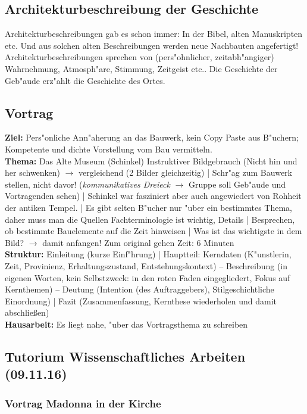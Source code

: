 \documentclass[emulatestandardclasses]{scrartcl}
\begin{document}
\subsection{Architekturbeschreibung der Geschichte}

Architekturbeschreibungen gab es schon immer: In der Bibel, alten Manuskripten etc. Und aus solchen alten Beschreibungen werden neue Nachbauten angefertigt!
Architekturbeschreibungen sprechen von (pers"ohnlicher, zeitabh"angiger) Wahrnehmung, Atmosph"are, Stimmung, Zeitgeist etc.. Die Geschichte der Geb"aude erz"ahlt die Geschichte des Ortes.


\subsection{Vortrag}

\textbf{Ziel:} Pers"onliche Ann"aherung an das Bauwerk, kein Copy Paste aus B"uchern; 
Kompetente und dichte Vorstellung vom Bau vermitteln. \\
\textbf{Thema:} Das Alte Museum (Schinkel)
Instruktiver Bildgebrauch (Nicht hin und her schwenken) $\rightarrow$ vergleichend (2 Bilder gleichzeitig) |
Schr"ag zum Bauwerk stellen, nicht davor! (\emph{kommunikatives Dreieck} $\rightarrow$ Gruppe soll Geb"aude und Vortragenden sehen) | 
Schinkel war fasziniert aber auch angewiedert von Rohheit der antiken Tempel. |
Es gibt selten B"ucher nur "uber ein bestimmtes Thema, daher muss man die Quellen 
Fachterminologie ist wichtig, Details | Besprechen, ob bestimmte Bauelemente auf die Zeit hinweisen | Was ist das wichtigste in dem Bild? $\rightarrow$ damit anfangen!
Zum original gehen
Zeit: 6 Minuten\\
\textbf{Struktur:} Einleitung (kurze Einf"hrung) | Hauptteil: Kerndaten (K"unstlerin, Zeit, Provinienz, Erhaltungszustand, Entstehungskontext) -- Beschreibung (in eigenen Worten, kein Selbstzweck: in den roten Faden eingegliedert, Fokus auf Kernthemen) -- Deutung (Intention (des Auftraggebers), Stilgeschichtliche Einordnung) | Fazit (Zusammenfassung, Kernthese wiederholen und damit abschlie\ss en)\\
\textbf{Hausarbeit:} Es liegt nahe, "uber das Vortragsthema zu schreiben

\subsection{Tutorium Wissenschaftliches Arbeiten (09.11.16)}

\subsubsection{Vortrag Madonna in der Kirche}
\end{document}
